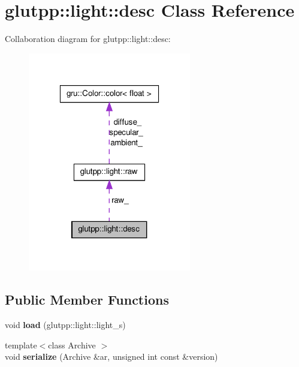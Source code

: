 \hypertarget{classglutpp_1_1light_1_1desc}{\section{glutpp\-:\-:light\-:\-:desc \-Class \-Reference}
\label{classglutpp_1_1light_1_1desc}
}


\-Collaboration diagram for glutpp\-:\-:light\-:\-:desc\-:
\nopagebreak
\begin{figure}[H]
\begin{center}
\leavevmode
\includegraphics[width=202pt]{classglutpp_1_1light_1_1desc__coll__graph}
\end{center}
\end{figure}
\subsection*{\-Public \-Member \-Functions}
\begin{DoxyCompactItemize}
\item 
\hypertarget{classglutpp_1_1light_1_1desc_a4da8561e1313aa9fc72a30bae278faa5}{void {\bfseries load} (glutpp\-::light\-::light\-\_\-s)}\label{classglutpp_1_1light_1_1desc_a4da8561e1313aa9fc72a30bae278faa5}

\item 
\hypertarget{classglutpp_1_1light_1_1desc_ad1d6be4fb431b158e6c5b5e97f45deb9}{{\footnotesize template$<$class Archive $>$ }\\void {\bfseries serialize} (\-Archive \&ar, unsigned int const \&version)}\label{classglutpp_1_1light_1_1desc_ad1d6be4fb431b158e6c5b5e97f45deb9}

\end{DoxyCompactItemize}
